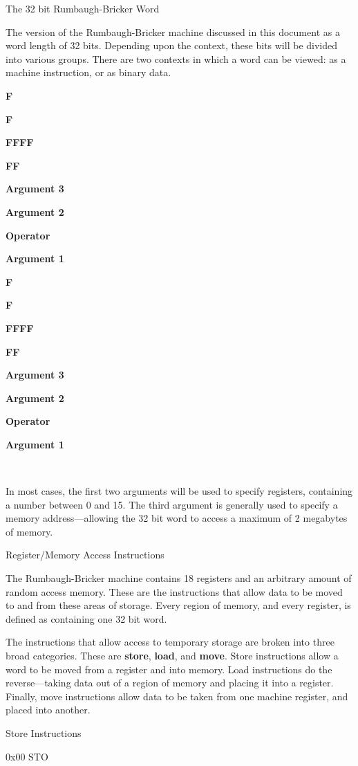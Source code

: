 \documentclass[]{article}
\begin{document}
The 32 bit Rumbaugh-Bricker Word

The version of the Rumbaugh-Bricker machine discussed in this document
as a word length of 32 bits. Depending upon the context, these bits will
be divided into various groups. There are two contexts in which a word
can be viewed: as a machine instruction, or as binary data.~

\textbf{F}

\textbf{F}

\textbf{FFFF}

\textbf{FF}

\textbf{Argument 3}

\textbf{Argument 2}

\textbf{Operator}

\textbf{Argument 1}

\textbf{F}

\textbf{F}

\textbf{FFFF}

\textbf{FF}

\textbf{Argument 3}

\textbf{Argument 2}

\textbf{Operator}

\textbf{Argument 1}

~

In most cases, the first two arguments will be used to specify
registers, containing a number between 0 and 15. The third argument is
generally used to specify a memory address---allowing the 32 bit word to
access a maximum of 2 megabytes of memory.

Register/Memory Access Instructions

The Rumbaugh-Bricker machine contains 18 registers and an arbitrary
amount of random access memory. These are the instructions that allow
data to be moved to and from these areas of storage. Every region of
memory, and every register, is defined as containing one 32 bit word.

The instructions that allow access to temporary storage are broken into
three broad categories. These are \textbf{store}, \textbf{load}, and
\textbf{move}. Store instructions allow a word to be moved from a
register and into memory. Load instructions do the reverse---taking data
out of a region of memory and placing it into a register. Finally, move
instructions allow data to be taken from one machine register, and
placed into another.

Store Instructions

0x00 STO
\end{document}
